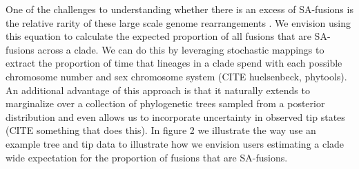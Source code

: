 \documentclass[12pt]{article}
\begin{document}
One of the challenges to understanding whether there is an excess of SA-fusions is the relative rarity of these large scale genome rearrangements \citep{blackmon2019}. %
We envision using this equation to calculate the expected proportion of all fusions that are SA-fusions across a clade.
We can do this by leveraging stochastic mappings to extract the proportion of time that lineages in a clade spend with each possible chromosome number and sex chromosome system (CITE huelsenbeck, phytools).
An additional advantage of this approach is that it naturally extends to marginalize over a collection of phylogenetic trees sampled from a posterior distribution and even allows us to incorporate uncertainty in observed tip states (CITE something that does this).
In figure 2 we illustrate the way use an example tree and tip data to illustrate how we envision users estimating a clade wide expectation for the proportion of fusions that are SA-fusions.









\clearpage


\end{document}
